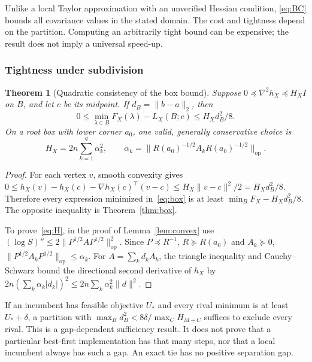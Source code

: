 \documentclass[preprint,11pt,numbers]{elsarticle}
\newtheorem{theorem}{Theorem}
\theoremstyle{remark}\newtheorem{remark}[theorem]{Remark}
\begin{document}
Unlike a local Taylor approximation with an unverified Hessian condition,
\eqref{eq:BC} bounds all covariance values in the stated domain. The cost and
tightness depend on the partition. Computing an arbitrarily tight bound can be
expensive; the result does not imply a universal speed-up.

\subsubsection{Tightness under subdivision}
\begin{theorem}[Quadratic consistency of the box bound]\label{thm:rate}
Suppose $0\preceq\nabla^2 h_X\preceq H_XI$ on $B$, and let $c$ be its midpoint.
If $d_B=\|b-a\|_2$, then
\begin{equation}\label{eq:rate}
0\leq\min_{\lambda\in B}F_X(\lambda)-L_X(B;c)
\leq H_Xd_B^2/8.
\end{equation}
On a root box with lower corner $a_0$, one valid, generally conservative choice is
\begin{equation}\label{eq:H}
H_X=2n\sum_{k=1}^q\alpha_k^2,\qquad
\alpha_k=\|R(a_0)^{-1/2}A_kR(a_0)^{-1/2}\|_{\mathrm{op}}.
\end{equation}
\end{theorem}
\begin{proof}
For each vertex $v$, smooth convexity gives
$0\leq h_X(v)-h_X(c)-\nabla h_X(c)^\top(v-c)\leq H_X\|v-c\|^2/2
=H_Xd_B^2/8$. Therefore every expression minimized in~\eqref{eq:box} is at least
$\min_BF_X-H_Xd_B^2/8$. The opposite inequality is Theorem~\ref{thm:box}.

To prove~\eqref{eq:H}, in the proof of Lemma~\ref{lem:convex} use
$(\log S)''\leq2\|P^{1/2}AP^{1/2}\|_{\mathrm{op}}^2$. Since
$P\preceq R^{-1}$, $R\succeq R(a_0)$ and $A_k\succeq0$,
$\|P^{1/2}A_kP^{1/2}\|_{\mathrm{op}}\leq\alpha_k$. For
$A=\sum_kd_kA_k$, the triangle inequality and Cauchy--Schwarz bound the directional
second derivative of $h_X$ by $2n(\sum_k\alpha_k|d_k|)^2
\leq2n\sum_k\alpha_k^2\|d\|^2$.
\end{proof}

If an incumbent has feasible objective $U_*$ and every rival minimum is at least
$U_*+\delta$, a partition with
$\max_Bd_B^2<8\delta/\max_CH_{M+C}$ suffices to exclude every rival. This is a
gap-dependent sufficiency result. It does not prove that a particular best-first
implementation has that many steps, nor that a local incumbent always has such
a gap. An exact tie has no positive separation gap.
\end{document}
